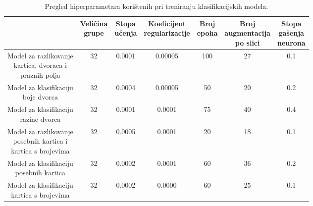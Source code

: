 \documentclass[diplomskirad]{fer}
\begin{document}
			\begin{table}[htb]
				\centering
				\caption{Pregled hiperparametara korištenih pri treniranju klasifikacijskih modela.}
				\label{tab:cnn_hiperparametri}
				
				\begin{adjustbox}{width=0.94\textwidth}
					\begin{tabular}{ccccccc}
						\toprule
						\makecell{\textbf{Model}} &
						\makecell{\textbf{Veličina}\\\textbf{grupe}} &
						\makecell{\textbf{Stopa}\\\textbf{učenja}} &
						\makecell{\textbf{Koeficijent}\\\textbf{regularizacije}} &
						\makecell{\textbf{Broj}\\\textbf{epoha}} &
						\makecell{\textbf{Broj}\\\textbf{augmentacija}\\\textbf{po slici}} &
						\makecell{\textbf{Stopa}\\\textbf{gašenja}\\\textbf{neurona}} \\ 
						\midrule
						
						\makecell{Model za razlikovanje\\kartica, dvoraca i\\praznih polja}
						& 32 & 0.0001 & 0.00005 & 100 & 27 & 0.1 \\[7mm]
						
						\makecell{Model za klasifikaciju\\boje dvorca}
						& 32 & 0.0004 & 0.00005 & 50 & 20 & 0.2 \\[7mm]
						
						\makecell{Model za klasifikaciju\\razine dvorca}
						& 32 & 0.0001 & 0.0001 & 75 & 40 & 0.4 \\[7mm]
						
						\makecell{Model za razlikovanje\\posebnih kartica i\\kartica s brojevima}
						& 32 & 0.0005 & 0.0001 & 20 & 18 & 0.1 \\[7mm]
						
						\makecell{Model za klasifikaciju\\posebnih kartica}
						& 32 & 0.0002 & 0.0001 & 60 & 36 & 0.2 \\[7mm]
						
						\makecell{Model za klasifikaciju\\kartica s brojevima}
						& 32 & 0.0002 & 0.0000 & 60 & 25 & 0.1 \\
						
						\bottomrule
					\end{tabular}
				\end{adjustbox}
			\end{table}
		
\end{document}
